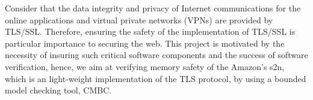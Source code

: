 Consider that the data integrity and privacy of Internet communications for the online applications and virtual private networks (VPNs) are provided by TLS/SSL. Therefore, ensuring the safety of the implementation of TLS/SSL is particular importance to securing the web. This project is motivated by the necessity of insuring such critical software components and the success of software verification, hence, we aim at verifying memory safety of the Amazon's s2n, which is an light-weight implementation of the TLS protocol, by using a bounded model checking tool, CMBC.













